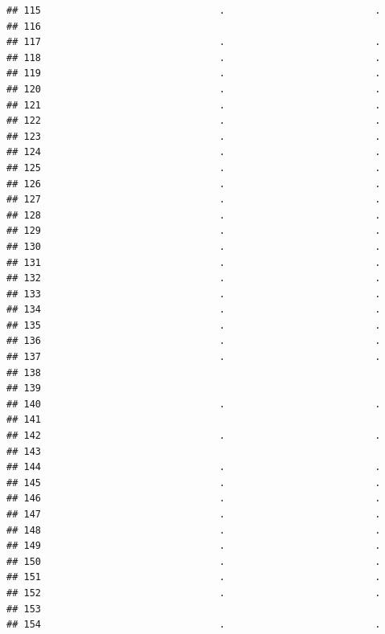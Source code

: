 \documentclass[
]{article}
\begin{document}
\begin{verbatim}
## 115                               .                          .
## 116                                                           
## 117                               .                          .
## 118                               .                          .
## 119                               .                          .
## 120                               .                          .
## 121                               .                          .
## 122                               .                          .
## 123                               .                          .
## 124                               .                          .
## 125                               .                          .
## 126                               .                          .
## 127                               .                          .
## 128                               .                          .
## 129                               .                          .
## 130                               .                          .
## 131                               .                          .
## 132                               .                          .
## 133                               .                          .
## 134                               .                          .
## 135                               .                          .
## 136                               .                          .
## 137                               .                          .
## 138                                                           
## 139                                                           
## 140                               .                          .
## 141                                                           
## 142                               .                          .
## 143                                                           
## 144                               .                          .
## 145                               .                          .
## 146                               .                          .
## 147                               .                          .
## 148                               .                          .
## 149                               .                          .
## 150                               .                          .
## 151                               .                          .
## 152                               .                          .
## 153                                                           
## 154                               .                          .

\end{verbatim}
\end{document}
